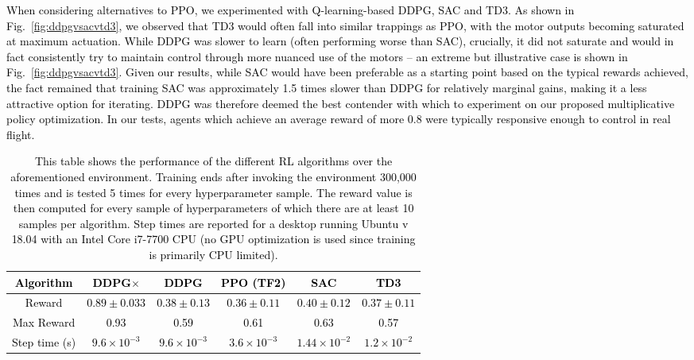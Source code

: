 \documentclass[letterpaper, 10 pt, conference]{ieeeconf} %
\newcommand{\rev}[1]{\textcolor{black}{#1}}
\begin{document}
    \rev{
    When considering alternatives to PPO, we experimented with Q-learning-based DDPG, SAC and TD3.
    As shown in Fig.~\ref{fig:ddpgvsacvtd3}, we observed that TD3 would often fall into similar trappings as PPO, with the motor outputs becoming saturated at maximum actuation.
    While DDPG was slower to learn (often performing worse than SAC), crucially, it did not saturate and would in fact consistently try to maintain control through more nuanced use of the motors -- an extreme but illustrative case is shown in Fig.~\ref{fig:ddpgvsacvtd3}.
    Given our results, while SAC would have been preferable as a starting point based on the typical rewards achieved, the fact remained that training SAC was approximately 1.5 times slower than DDPG for relatively marginal gains, making it a less attractive option for iterating.
    DDPG was therefore deemed the best contender with which to experiment on our proposed multiplicative policy optimization.
    In our tests, agents which achieve an average reward of more 0.8 were typically responsive enough to control in real flight.
    }
    
    \begin{table*}[t]
        \centering
        \caption{\rev{This table shows the performance of the different RL algorithms over the aforementioned environment. Training ends after invoking the environment 300,000 times and is tested 5 times for every hyperparameter sample.
        The reward value is then computed for every sample of hyperparameters of which there are at least 10 samples per algorithm. 
        Step times are reported for a desktop running Ubuntu v 18.04 with an Intel Core i7-7700 CPU (no GPU optimization is used since training is primarily CPU limited).} 
        }
        \vspace{.5\baselineskip}
        \rev{
        \begin{tabular}{c|c|c|c|c|c}
            \hline
            Algorithm & DDPG$\times$ & DDPG & PPO (TF2) & SAC & TD3 \\ \hline
            Reward  & $0.89\pm0.033$ & $0.38\pm0.13$ & $0.36\pm0.11$ & $0.40\pm0.12$ & $0.37\pm0.11$ \\
            Max Reward & 0.93 & 0.59 & 0.61 & 0.63 & 0.57 \\
            Step time (s) & $9.6 \times 10^{-3}$ & $9.6 \times 10^{-3}$ & $3.6 \times 10^{-3}$ & $1.44 \times 10^{-2}$ & $1.2 \times 10^{-2}$ \\ \hline
        \end{tabular}
        }
        \label{tab:alg_comp}
    \end{table*}
    
\end{document}
